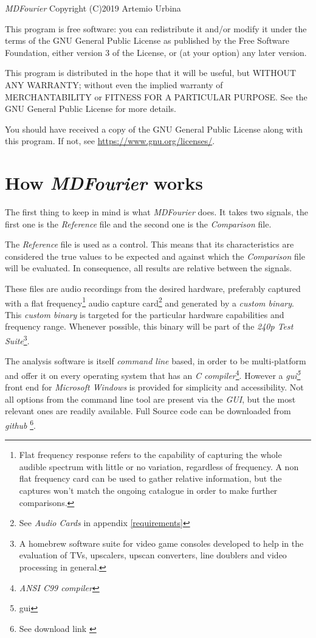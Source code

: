 \documentclass[10pt,a4paper]{report}
\newcommand{\define}[1] {
	\textit{\acrshort{#1}\footnote{\acrlong{#1}}}}
\begin{document}
\textit{MDFourier} Copyright (C)2019 Artemio Urbina

This program is free software: you can redistribute it and/or modify
it under the terms of the GNU General Public License as published by
the Free Software Foundation, either version 3 of the License, or
(at your option) any later version.

This program is distributed in the hope that it will be useful,
but WITHOUT ANY WARRANTY; without even the implied warranty of
MERCHANTABILITY or FITNESS FOR A PARTICULAR PURPOSE.  See the
GNU General Public License for more details.

You should have received a copy of the GNU General Public License
along with this program.  If not, see \url{https://www.gnu.org/licenses/}.

\chapter{How \textit{MDFourier} works}
\label{howitworks}

The first thing to keep in mind is what \textit{MDFourier} does. It takes two signals, the first one is the \textit{Reference} file and the second one is the \textit{Comparison} file.

The \textit{Reference} file is used as a control. This means that its characteristics are considered the true values to be expected and against which the \textit{Comparison} file will be evaluated. In consequence, all results are relative between the signals.

These files are audio recordings from the desired hardware, preferably captured with a flat frequency\footnote{Flat frequency response refers to the capability of capturing the whole audible spectrum with little or no variation, regardless of frequency. A non flat frequency card can be used to gather relative information, but the captures won't match the ongoing catalogue in order to make further comparisons.} audio capture card\footnote{See \textit{Audio Cards} in appendix \ref{requirements}} and generated by a \textit{custom binary}. This \textit{custom binary} is targeted for the particular hardware capabilities and frequency range. Whenever possible, this binary will be part of the \textit{240p Test Suite}\footnote{A homebrew software suite for video game consoles developed to help in the evaluation of TVs, upscalers, upscan converters, line doublers and video processing in general.\cite{240pSuite}}. 

The analysis software is itself \textit{command line} based, in order to be multi-platform and offer it on every operating system that has an \textit{C compiler}\footnote{\textit{ANSI C99 compiler}}. However a \define{gui} front end for \textit{Microsoft Windows} is provided for simplicity and accessibility. Not all options from the command line tool are present via the \textit{GUI}, but the most relevant ones are readily available. Full Source code can be downloaded from \textit{github} \footnote{See download link \cite{sourcecode}}.
\end{document}
